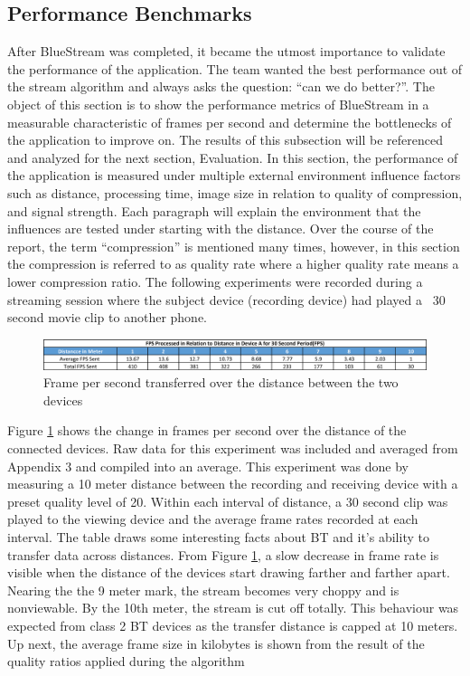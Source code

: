\documentclass[a4paper,12pt]{article}
\begin{document}
\subsection{Performance Benchmarks}
After BlueStream was completed, it became the utmost importance to validate the performance of the application. The team wanted the best performance out of the stream algorithm and always asks the question: “can we do better?”. The object of this section is to show the performance metrics of BlueStream in a measurable characteristic of frames per second and determine the bottlenecks of the application to improve on. The results of this subsection will be referenced and analyzed for the next section, Evaluation. In this section, the performance of the application is measured under multiple external environment influence factors such as distance, processing time, image size in relation to quality of compression, and signal strength. Each paragraph will explain the environment that the influences are tested under starting with the distance. Over the course of the report, the term “compression” is mentioned many times, however, in this section the compression is referred to as quality rate where a higher quality rate means a lower compression ratio. The following experiments were recorded during a streaming session where the subject device (recording device) had played a ~30 second movie clip to another phone.

\begin{figure}[h!]
\centering
\includegraphics[scale=.7]{Figures/Figure9.png}
\caption{Frame per second transferred over the distance between the two devices}
\label{fig:FPSoverDistance}
\end{figure}

Figure \ref{fig:FPSoverDistance} shows the change in frames per second over the distance of the connected devices. Raw data for this experiment was included and averaged from Appendix 3 and compiled into an average. This experiment was done by measuring a 10 meter distance between the recording and receiving device with a preset quality level of 20. Within each interval of distance, a 30 second clip was played to the viewing device and the average frame rates recorded at each interval. The table draws some interesting facts about BT and it’s ability to transfer data across distances. From Figure  \ref{fig:FPSoverDistance}, a slow decrease in frame rate is visible when the distance of the devices start drawing farther and farther apart. Nearing the the 9 meter mark, the stream becomes very choppy and is nonviewable. By the 10th meter, the stream is cut off totally. This behaviour was expected from class 2 BT devices as the transfer distance is capped at 10 meters. Up next, the average frame size in kilobytes is shown from the result of the quality ratios applied during the algorithm
\end{document}
